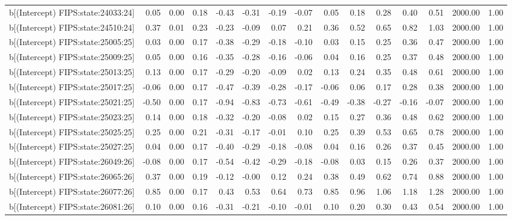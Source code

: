 \begin{table}[ht]
\begin{tabular}{rrrrrrrrrrrrrrr}
  b[(Intercept) FIPS:state:24033:24] & 0.05 & 0.00 & 0.18 & -0.43 & -0.31 & -0.19 & -0.07 & 0.05 & 0.18 & 0.28 & 0.40 & 0.51 & 2000.00 & 1.00 \\ 
  b[(Intercept) FIPS:state:24510:24] & 0.37 & 0.01 & 0.23 & -0.23 & -0.09 & 0.07 & 0.21 & 0.36 & 0.52 & 0.65 & 0.82 & 1.03 & 2000.00 & 1.00 \\ 
  b[(Intercept) FIPS:state:25005:25] & 0.03 & 0.00 & 0.17 & -0.38 & -0.29 & -0.18 & -0.10 & 0.03 & 0.15 & 0.25 & 0.36 & 0.47 & 2000.00 & 1.00 \\ 
  b[(Intercept) FIPS:state:25009:25] & 0.05 & 0.00 & 0.16 & -0.35 & -0.28 & -0.16 & -0.06 & 0.04 & 0.16 & 0.25 & 0.37 & 0.48 & 2000.00 & 1.00 \\ 
  b[(Intercept) FIPS:state:25013:25] & 0.13 & 0.00 & 0.17 & -0.29 & -0.20 & -0.09 & 0.02 & 0.13 & 0.24 & 0.35 & 0.48 & 0.61 & 2000.00 & 1.00 \\ 
  b[(Intercept) FIPS:state:25017:25] & -0.06 & 0.00 & 0.17 & -0.47 & -0.39 & -0.28 & -0.17 & -0.06 & 0.06 & 0.17 & 0.28 & 0.38 & 2000.00 & 1.00 \\ 
  b[(Intercept) FIPS:state:25021:25] & -0.50 & 0.00 & 0.17 & -0.94 & -0.83 & -0.73 & -0.61 & -0.49 & -0.38 & -0.27 & -0.16 & -0.07 & 2000.00 & 1.00 \\ 
  b[(Intercept) FIPS:state:25023:25] & 0.14 & 0.00 & 0.18 & -0.32 & -0.20 & -0.08 & 0.02 & 0.15 & 0.27 & 0.36 & 0.48 & 0.62 & 2000.00 & 1.00 \\ 
  b[(Intercept) FIPS:state:25025:25] & 0.25 & 0.00 & 0.21 & -0.31 & -0.17 & -0.01 & 0.10 & 0.25 & 0.39 & 0.53 & 0.65 & 0.78 & 2000.00 & 1.00 \\ 
  b[(Intercept) FIPS:state:25027:25] & 0.04 & 0.00 & 0.17 & -0.40 & -0.29 & -0.18 & -0.08 & 0.04 & 0.16 & 0.26 & 0.37 & 0.45 & 2000.00 & 1.00 \\ 
  b[(Intercept) FIPS:state:26049:26] & -0.08 & 0.00 & 0.17 & -0.54 & -0.42 & -0.29 & -0.18 & -0.08 & 0.03 & 0.15 & 0.26 & 0.37 & 2000.00 & 1.00 \\ 
  b[(Intercept) FIPS:state:26065:26] & 0.37 & 0.00 & 0.19 & -0.12 & -0.00 & 0.12 & 0.24 & 0.38 & 0.49 & 0.62 & 0.74 & 0.88 & 2000.00 & 1.00 \\ 
  b[(Intercept) FIPS:state:26077:26] & 0.85 & 0.00 & 0.17 & 0.43 & 0.53 & 0.64 & 0.73 & 0.85 & 0.96 & 1.06 & 1.18 & 1.28 & 2000.00 & 1.00 \\ 
  b[(Intercept) FIPS:state:26081:26] & 0.10 & 0.00 & 0.16 & -0.31 & -0.21 & -0.10 & -0.01 & 0.10 & 0.20 & 0.30 & 0.43 & 0.54 & 2000.00 & 1.00 \\ 

\end{tabular}
\end{table}
